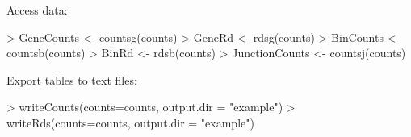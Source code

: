 \documentclass{article}
\begin{document}
Access data:

\begin{Schunk}
\begin{Sinput}
> GeneCounts <- countsg(counts)
> GeneRd <- rdsg(counts)
> BinCounts <- countsb(counts)
> BinRd <- rdsb(counts)
> JunctionCounts <- countsj(counts)
\end{Sinput}
\end{Schunk}

Export tables to text files:

\begin{Schunk}
\begin{Sinput}
> writeCounts(counts=counts, output.dir = "example")
> writeRds(counts=counts, output.dir = "example")
\end{Sinput}
\end{Schunk}
\end{document}
